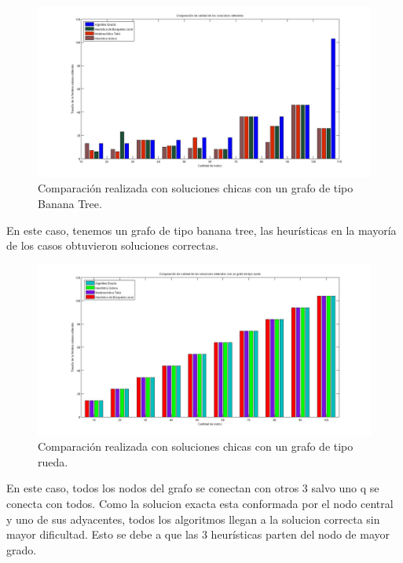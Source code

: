  \begin{figure}[H] %
\begin{center}
\includegraphics[width=400pt]{../imgs/calidadSolucionesChicas3.jpg}
\caption{Comparación realizada con soluciones chicas con un grafo de tipo Banana Tree.}
\end{center}
\end{figure}

En este caso, tenemos un grafo de tipo banana tree, las heurísticas en la mayoría de los casos obtuvieron soluciones correctas.

 \begin{figure}[H] %
\begin{center}
\includegraphics[width=400pt]{../imgs/calidadSolucionesChicas2.jpg}
\caption{Comparación realizada con soluciones chicas con un grafo de tipo rueda.}
\end{center}
\end{figure}

En este caso, todos los nodos del grafo se conectan con otros 3 salvo uno q se conecta con todos. Como la solucion exacta esta conformada por el nodo central y uno de sus adyacentes, todos los algoritmos llegan a la solucion correcta sin mayor dificultad. Esto se debe a que las 3 heurísticas parten del nodo de mayor grado.

